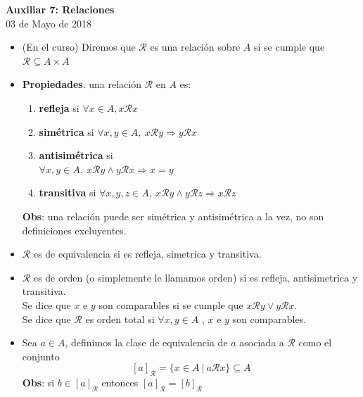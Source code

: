 \documentclass[letterpaper,10pt]{article}
\theoremstyle{plain}
\begin{document}
\begin{center}
{\bf \Large Auxiliar 7: Relaciones}\\
{03 de Mayo de 2018}
\end{center}
\begin{framed}
		\begin{multicols}{2}
		    \begin{itemize}  
                    \item (En el curso) Diremos que $\mathcal{R}$ es una relación sobre $A$ si se cumple que $\mathcal{R} \subseteq A\times A$
                    \item \textbf{Propiedades}. una relación $\mathcal{R}$ en $A$ es:
                        \begin{enumerate}
                            \item \textbf{refleja} si $\forall x \in A, x \mathcal{R} x$ 
                            \item \textbf{simétrica} si $\forall x,y \in A, ~ x\mathcal{R}y \Rightarrow y\mathcal{R}x $
                            \item \textbf{antisimétrica} si\\ $\forall x,y \in A,~ x\mathcal{R}y \land  y\mathcal{R}x \Rightarrow x=y$
                            \item \textbf{transitiva} si $\forall x,y,z \in A,~ x\mathcal{R}y \land  y\mathcal{R}z \Rightarrow x\mathcal{R}z$
                        \end{enumerate}
                    \textbf{Obs}: una relación puede ser simétrica y antisimétrica a la vez, no son definiciones excluyentes.
        
                    \item $\mathcal{R}$ es de equivalencia si es refleja, simetrica y transitiva.

                    \item $\mathcal{R}$ es de orden (o simplemente le llamamos orden) si es refleja, antisimetrica y transitiva.\\ 
                    Se dice que $x$ e $y$ son comparables si se cumple que $x\mathcal{R}y \lor y\mathcal{R}x$.\\
                    Se dice que $\mathcal{R}$ es orden total si $\forall x,y \in A$ , $x$ e $y$ son comparables.
    
                    \item Sea $a \in A$, definimos la clase de equivalencia de $a$ asociada a $\mathcal{R}$ como el conjunto 
                        $$ [a]_{\mathcal{R}}= \{x \in A ~|~ a\mathcal{R}x\} \subseteq A $$
                    \textbf{Obs}: si $b \in [a]_{\mathcal{R}}$ entonces $[a]_{\mathcal{R}}=[b]_{\mathcal{R}}$
    

\end{itemize}
\end{multicols}
\end{framed}
\end{document}
